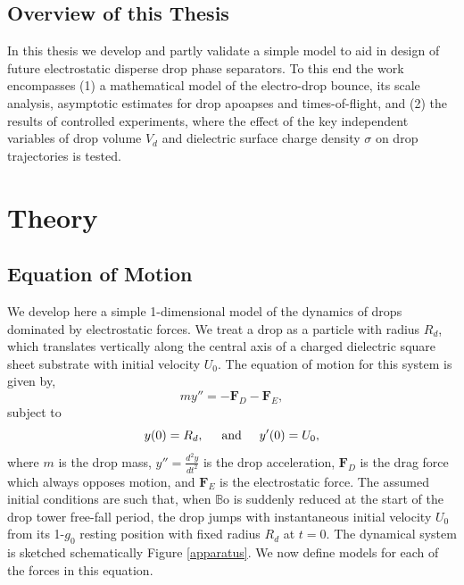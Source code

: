 \documentclass[12pt,a4paper,oneside]{book}
\begin{document}
\section{Overview of this Thesis}
In this thesis we develop and partly validate a simple model to aid in design of future electrostatic disperse drop phase separators. To this end the work encompasses (1) a mathematical model of the electro-drop bounce, its scale analysis, asymptotic estimates for drop apoapses and times-of-flight, and (2) the results of controlled experiments, where the effect of the key independent variables of drop volume $V_d$ and dielectric surface charge density $\sigma$ on drop trajectories is tested. 

\chapter{Theory}
\section{Equation of Motion}
We develop here a simple 1-dimensional model of the dynamics of drops dominated by electrostatic forces. We treat a drop as a particle with radius $R_d$, which translates vertically along the central axis of a charged dielectric square sheet substrate with initial velocity $U_0$. The equation of motion for this system is given by,
\begin{equation}
m y'' = - \mathbf{F}_D - \mathbf{F}_E,
\label{gov_eqn}
\end{equation}
subject to
\begin{equation}
y(0) = R_d, \hspace{5 mm} \mbox{and} \hspace{5 mm} y'(0) = U_0,
\end{equation}
where $m$ is the drop mass, $y'' = \frac{d^2 y}{d t^2}$ is the drop acceleration, $\mathbf{F}_D$ is the drag force which always opposes motion, and $\mathbf{F}_E$ is the electrostatic force. The assumed initial conditions are such that, when $\mathbb{B}\mbox{o}$ is suddenly reduced at the start of the drop tower free-fall period, the drop jumps with instantaneous initial velocity $U_0$ from its 1-$g_0$ resting position with fixed radius $R_d$ at $t=0$. The dynamical system is sketched schematically Figure \ref{apparatus}. We now define models for each of the forces in this equation.
\end{document}
